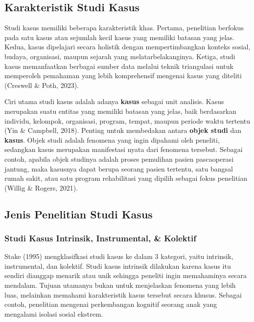 \documentclass[
  indonesian,
  letterpaper,
  DIV=11,
  numbers=noendperiod]{scrreprt}
\begin{document}
\subsection{Karakteristik Studi Kasus}\label{karakteristik-studi-kasus}

Studi kasus memiliki beberapa karakteristik khas. Pertama, penelitian
berfokus pada satu kasus atau sejumlah kecil kasus yang memiliki batasan
yang jelas. Kedua, kasus dipelajari secara holistik dengan
mempertimbangkan konteks sosial, budaya, organisasi, maupun sejarah yang
melatarbelakanginya. Ketiga, studi kasus memanfaatkan berbagai sumber
data melalui teknik triangulasi untuk memperoleh pemahaman yang lebih
komprehensif mengenai kasus yang diteliti (Creswell \& Poth, 2023).

Ciri utama studi kasus adalah adanya \textbf{kasus} sebagai unit
analisis. Kasus merupakan suatu entitas yang memiliki batasan yang
jelas, baik berdasarkan individu, kelompok, organisasi, program, tempat,
maupun periode waktu tertentu (Yin \& Campbell, 2018). Penting untuk
membedakan antara \textbf{objek studi} dan \textbf{kasus}. Objek studi
adalah fenomena yang ingin dipahami oleh peneliti, sedangkan kasus
merupakan manifestasi nyata dari fenomena tersebut. Sebagai contoh,
apabila objek studinya adalah proses pemulihan pasien pascaoperasi
jantung, maka kasusnya dapat berupa seorang pasien tertentu, satu
bangsal rumah sakit, atau satu program rehabilitasi yang dipilih sebagai
fokus penelitian (Willig \& Rogers, 2021).

\subsection{Jenis Penelitian Studi
Kasus}\label{jenis-penelitian-studi-kasus}

\subsubsection{Studi Kasus Intrinsik, Instrumental, \&
Kolektif}\label{studi-kasus-intrinsik-instrumental-kolektif}

Stake (1995) mengklasifkasi studi kasus ke dalam 3 kategori, yaitu
intrinsik, instrumental, dan kolektif. Studi kasus intrinsik dilakukan
karena kasus itu sendiri dianggap menarik atau unik sehingga peneliti
ingin memahaminya secara mendalam. Tujuan utamanya bukan untuk
menjelaskan fenomena yang lebih luas, melainkan memahami karakteristik
kasus tersebut secara khusus. Sebagai contoh, penelitian mengenai
perkembangan kognitif seorang anak yang mengalami isolasi sosial
ekstrem.
\end{document}
